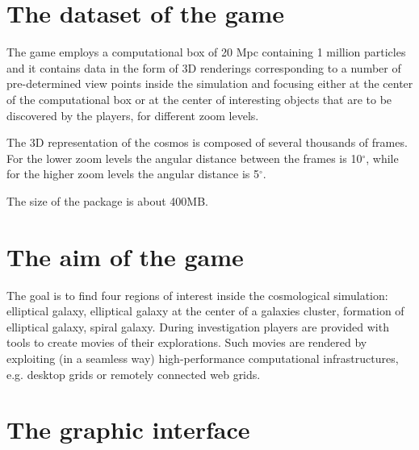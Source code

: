 \section{The dataset of the game}
The game employs a computational box of 20 Mpc containing 1 million particles and 
it contains data in the form of 3D renderings corresponding to a number of pre-determined view points inside the simulation and focusing either at the center of the computational box or at the center of interesting objects that are to be discovered by the players, for different zoom levels. \par
The 3D representation of the cosmos is composed of several thousands of frames. For the lower zoom levels the angular distance  between the frames is 10$^\circ$, while for the higher zoom levels the angular distance is 5$^\circ$.\par
The size of the package is about 400MB.

\section{The aim of the game}
The goal is to find four regions of interest inside the cosmological simulation:  elliptical galaxy, elliptical galaxy at the center of a galaxies cluster,  formation of elliptical galaxy, spiral galaxy. During investigation players are provided with tools to create movies of their explorations. Such movies are rendered by exploiting (in a seamless way) high-performance computational infrastructures, e.g. desktop grids or remotely connected web grids.\par

\section{The graphic interface}

